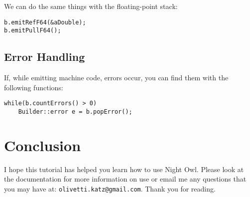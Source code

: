 \documentclass[10pt,a4paper]{article}
\begin{document}
We can do the same things with the floating-point stack:
\begin{verbatim}
b.emitRefF64(&aDouble);
b.emitPullF64();
\end{verbatim}

\subsection{Error Handling}
If, while emitting machine code, errors occur, you can find them with the following functions:
\begin{verbatim}
while(b.countErrors() > 0)
	Builder::error e = b.popError();
\end{verbatim}

\section{Conclusion}
I hope this tutorial has helped you learn how to use Night Owl. Please look at the documentation for more information on use or email me any questions that you may have at: \verb|olivetti.katz@gmail.com|. Thank you for reading.
\end{document}
